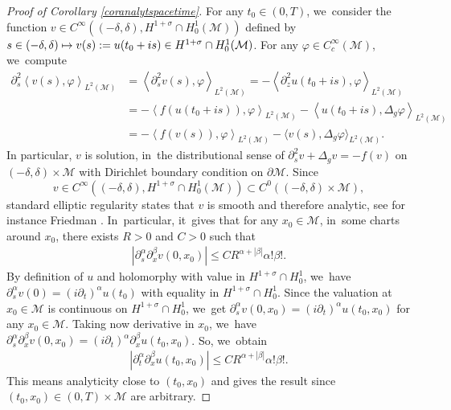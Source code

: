 \documentclass[JEP,XML,SOM,Unicode,published]{cedram}
\newcommand\mto{\mathchoice{\longmapsto}{\mapsto}{\mapsto}{\mapsto}}
\theoremstyle{definition}
\let\mc\mathcal
\newcommand{\M}{\mc{M}}
\begin{document}
\begin{proof}[Proof of Corollary \ref{coranalytspacetime}]
For any $t_0\in (0,T)$, we~consider the function $v\in C^{\infty}((-\delta,\delta),H^{1+\sigma}\cap H^1_0(\M))$ defined by $s\in (-\delta,\delta)\mto v(s):=u(t_0+is)\in H^{1+\sigma}\cap H^1_0(\M)$. For any $\varphi\in C^{\infty}_c(\M)$, we~compute\vspace*{-3pt}
\begin{align*}
\partial_s^2 \left<v(s),\varphi\right>_{L^2(\M)}&=\left<\partial_s^2 v(s),\varphi\right>_{L^2(\M)}=-\left<\partial_z^2 u(t_0+is),\varphi\right>_{L^2(\M)}\\
&=-\left<f(u(t_0+is)),\varphi\right>_{L^2(\M)}-\left<u(t_0+is),\Delta_g \varphi\right>_{L^2(\M)}\\
&=-\left<f(v(s)),\varphi\right>_{L^2(\M)}-\langle v(s),\Delta_g \varphi\rangle_{L^2(\M)}.
\end{align*}
In particular, $v$ is solution, in~the distributional sense of $\partial_s^2v+\Delta_g v=-f(v)$ on $(-\delta,\delta)\times \M$ with Dirichlet boundary condition on $\partial \M$. Since
\[
v\in C^{\infty}((-\delta, \delta),H^{1+\sigma}\cap H^1_0(\M))\subset C^0((-\delta,\delta)\times \M),
\]
standard elliptic regularity states that $v$ is smooth and therefore analytic, see for instance Friedman \cite[Th.\,5]{Friedman:58}. In~particular, it~gives that for any $x_0\in \M$, in~some charts around $x_0$, there exists $R>0$ and $C>0$ such that
\begin{align*}
\left| \partial_s^{\alpha}\partial_x^{\beta}v(0,x_0)\right|\leq C R^{\alpha+|\beta|}\alpha!\beta!.
\end{align*}
By definition of $u$ and holomorphy with value in $H^{1+\sigma}\cap H^1_0$, we~have $\partial_s^{\alpha}v(0)=(i\partial_t)^{\alpha}u(t_0)$ with equality in $H^{1+\sigma}\cap H^1_0$. Since the valuation at $x_0\in \M$ is continuous on $H^{1+\sigma}\cap H^1_0$, we~get $\partial_s^{\alpha}v(0,x_0)=(i\partial_t)^{\alpha}u(t_0,x_0)$ for any $x_0\in \M$. Taking now derivative in $x_0$, we~have $\partial_s^{\alpha}\partial_x^{\beta}v(0,x_0)=(i\partial_t)^{\alpha}\partial_x^{\beta}u(t_0,x_0)$. So, we~obtain
\begin{align*}
\left| \partial_t^{\alpha}\partial_x^{\beta}u(t_0,x_0)\right|\leq C R^{\alpha+|\beta|}\alpha!\beta!.
\end{align*}
This means analyticity close to $(t_0,x_0)$ and gives the result since $(t_0,x_0)\in (0,T)\times \M$ are arbitrary.
\end{proof}
\end{document}
